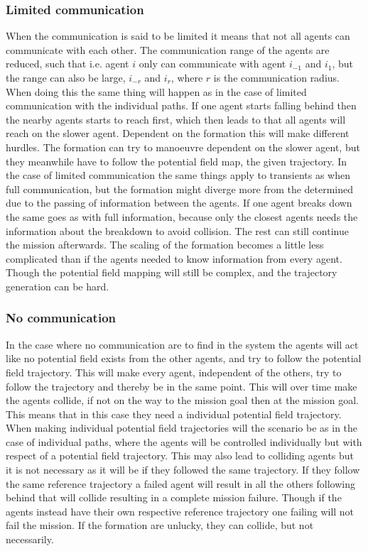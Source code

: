 \subsubsection{Limited communication}
When the communication is said to be limited it means that not all agents can communicate with each other. The communication range of the agents are reduced, such that i.e. agent $i$ only can communicate with agent $i_{-1}$ and $i_{1}$, but the range can also be large, $i_{-r}$ and $i_{r}$, where $r$ is the communication radius. When doing this the same thing will happen as in the case of limited communication with the individual paths. If one agent starts falling behind then the nearby agents starts to reach first, which then leads to that all agents will reach on the slower agent. Dependent on the formation this will make different hurdles. The formation can try to manoeuvre dependent on the slower agent, but they meanwhile have to follow the potential field map, the given trajectory. In the case of limited communication the same things apply to transients as when full communication, but the formation might diverge more from the determined due to the passing of information between the agents. If one agent breaks down the same goes as with full information, because only the closest agents needs the information about the breakdown to avoid collision. The rest can still continue the mission afterwards. The scaling of the formation becomes a little less complicated than if the agents needed to know information from every agent. Though the potential field mapping will still be complex, and the trajectory generation can be hard.

\subsubsection{No communication}
In the case where no communication are to find in the system the agents will act like no potential field exists from the other agents, and try to follow the potential field trajectory. This will make every agent, independent of the others, try to follow the trajectory and thereby be in the same point. This will over time make the agents collide, if not on the way to the mission goal then at the mission goal. This means that in this case they need a individual potential field trajectory. When making individual potential field trajectories will the scenario be as in the case of individual paths, where the agents will be controlled individually but with respect of a potential field trajectory. This may also lead to colliding agents but it is not necessary as it will be if they followed the same trajectory. If they follow the same reference trajectory a failed agent will result in all the others following behind that will collide resulting in a complete mission failure. Though if the agents instead have their own respective reference trajectory one failing will not fail the mission. If the formation are unlucky, they can collide, but not necessarily.

